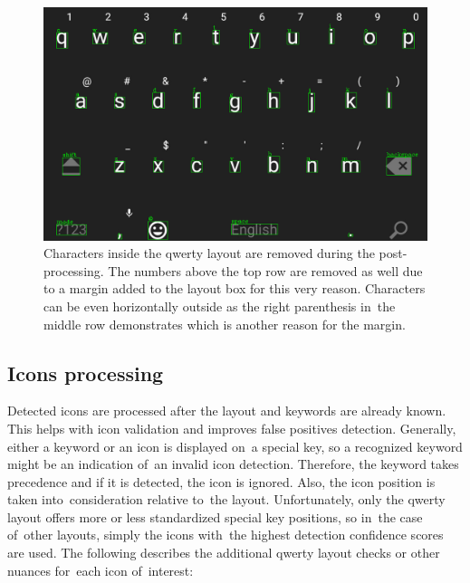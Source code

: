 \begin{figure}[!hbt]
    \includegraphics[width=1\textwidth]{img/design/postprocessing-layout-qwerty-removed-false-positives.png}
    \caption{Characters inside the qwerty layout are removed during the post-processing. The numbers above the top row are removed as well due to a margin added to the layout box for this very reason. Characters can be even horizontally outside as the right parenthesis in~the middle row demonstrates which is another reason for the margin.}
    \label{postprocessing-layout-qwerty-removed-false-positives}
\end{figure}

\subsection{Icons processing}
\label{postprocessing-icons}
Detected icons are processed after the layout and keywords are already known. This helps with icon validation and improves false positives detection. Generally, either a keyword or an icon is displayed on~a special key, so a recognized keyword might be an indication of~an invalid icon detection. Therefore, the keyword takes precedence and if it is detected, the icon is ignored. Also, the icon position is taken into~consideration relative to~the layout. Unfortunately, only the qwerty layout offers more or less standardized special key positions, so in~the case of~other layouts, simply the icons with~the highest detection confidence scores are used. The following describes the additional qwerty layout checks or other nuances for~each icon of~interest:

